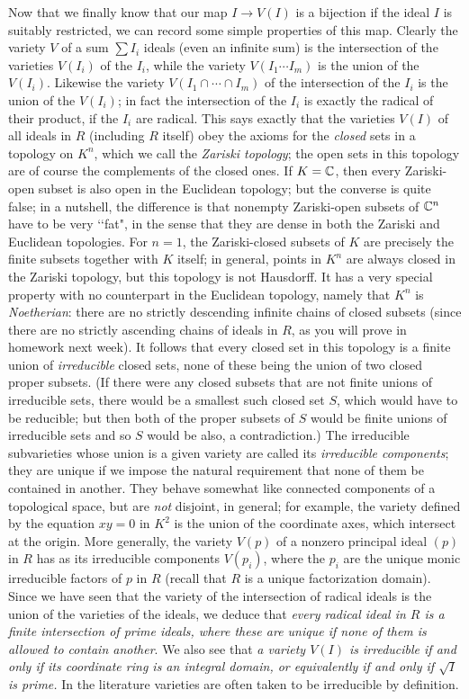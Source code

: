 Now that we finally know that our map $I\rightarrow V(I)$ is a bijection if the ideal $I$ is suitably restricted, we can record some simple properties of this map.  Clearly the variety $V$ of a sum
$\sum I_i$ ideals (even an infinite sum) is the intersection of the varieties $V(I_i)$ of the $I_i$, while the variety $V(I_1\cdots I_m)$ is the union of the $V(I_i)$.  Likewise the variety
$V(I_1\cap\cdots\cap I_m)$ of the intersection of the $I_i$ is the union of the $V(I_i)$; in fact the intersection of the $I_i$ is exactly the radical of their product, if the $I_i$ are radical.  This says exactly that the varieties $V(I)$ of all ideals in $R$ (including $R$ itself) obey the axioms for the {\sl closed} sets in a topology on $K^n$, which we call the {\sl Zariski topology}; the open sets in this topology are of course the complements of the closed ones.  If $K=\Bbb C$, then every Zariski-open subset is also open in the Euclidean topology; but the converse is quite false; in a nutshell, the difference is that nonempty Zariski-open subsets of $\Bbb C^n$ have to be very \lq\lq fat", in the sense that they are dense in both the Zariski and Euclidean topologies.  For $n=1$, the Zariski-closed subsets of $K$ are precisely the finite subsets together with $K$ itself; in general, points in $K^n$ are always closed in the Zariski topology, but this topology is not Hausdorff.  It has a very special property with no counterpart in the Euclidean topology, namely that $K^n$ is {\sl Noetherian}:  there are no strictly descending infinite chains of closed subsets (since there are no strictly ascending chains of ideals in $R$, as you will prove in homework next week).  It follows that every closed set in this topology is a finite union of {\sl irreducible} closed sets, none of these being the union of two closed proper subsets.  (If there were any closed subsets that are not finite unions of irreducible sets, there would be a smallest such closed set $S$, which would have to be reducible; but then both of the proper subsets of $S$ would be finite unions of irreducible sets and so $S$ would be also, a contradiction.)  The irreducible subvarieties whose union is a given variety are called its {\sl irreducible components}; they are unique if we impose the natural requirement that none of them be contained in another.  They behave somewhat like connected components of a topological space, but are {\sl not} disjoint, in general; for example, the variety defined by the equation $xy = 0$ in $K^2$ is the union of the coordinate axes, which intersect at the origin.  More generally, the variety $V(p)$ of a nonzero principal ideal $(p)$ in $R$ has as its irreducible components $V(p_i)$, where the $p_i$ are the unique monic irreducible factors of $p$ in $R$ (recall that $R$ is a unique factorization domain).  Since we have seen that the variety of the intersection of radical ideals is the union of the varieties of the ideals, we deduce that {\sl every radical ideal in $R$ is a finite intersection of prime ideals, where these are unique if none of them is allowed to contain another}.  We also see that {\sl a variety $V(I)$ is irreducible if and only if its coordinate ring is an integral domain, or equivalently if and only if
$\sqrt{I}$ is prime.}  In the literature varieties are often taken to be irreducible by definition.